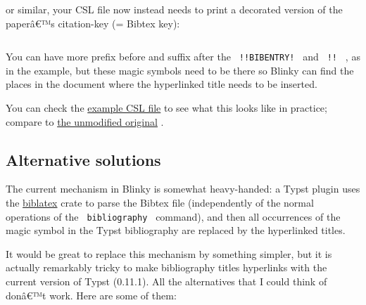 or similar, your CSL file now instead needs to print a decorated version
of the paperâ€™s citation-key (= Bibtex key):

\begin{verbatim}
\end{verbatim}

You can have more prefix before and suffix after the
\texttt{\ !!BIBENTRY!\ } and \texttt{\ !!\ } , as in the example, but
these magic symbols need to be there so Blinky can find the places in
the document where the hyperlinked title needs to be inserted.

You can check the
\href{https://github.com/alexanderkoller/typst-blinky/blob/main/examples/association-for-computational-linguistics-blinky.csl}{example
CSL file} to see what this looks like in practice; compare to
\href{https://github.com/citation-style-language/styles/blob/master/association-for-computational-linguistics.csl}{the
unmodified original} .

\subsection{Alternative solutions}\label{alternative-solutions}

The current mechanism in Blinky is somewhat heavy-handed: a Typst plugin
uses the \href{https://github.com/typst/biblatex}{biblatex} crate to
parse the Bibtex file (independently of the normal operations of the
\texttt{\ bibliography\ } command), and then all occurrences of the
magic symbol in the Typst bibliography are replaced by the hyperlinked
titles.

It would be great to replace this mechanism by something simpler, but it
is actually remarkably tricky to make bibliography titles hyperlinks
with the current version of Typst (0.11.1). All the alternatives that I
could think of donâ€™t work. Here are some of them:

